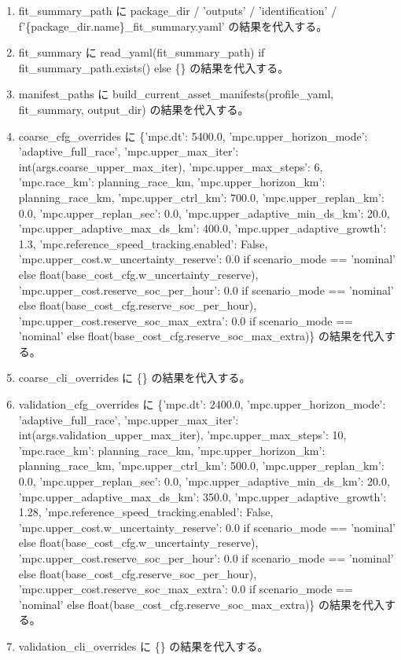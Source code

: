 \documentclass[a4paper,11pt]{article}
\begin{document}
\begin{enumerate}[leftmargin=1.8em]
\item fit\_summary\_path に package\_dir / 'outputs' / 'identification' / f'\{package\_dir.name\}\_fit\_summary.yaml' の結果を代入する。
\item fit\_summary に read\_yaml(fit\_summary\_path) if fit\_summary\_path.exists() else \{\} の結果を代入する。
\item manifest\_paths に build\_current\_asset\_manifests(profile\_yaml, fit\_summary, output\_dir) の結果を代入する。
\item coarse\_cfg\_overrides に \{'mpc.dt': 5400.0, 'mpc.upper\_horizon\_mode': 'adaptive\_full\_race', 'mpc.upper\_max\_iter': int(args.coarse\_upper\_max\_iter), 'mpc.upper\_max\_steps': 6, 'mpc.race\_km': planning\_race\_km, 'mpc.upper\_horizon\_km': planning\_race\_km, 'mpc.upper\_ctrl\_km': 700.0, 'mpc.upper\_replan\_km': 0.0, 'mpc.upper\_replan\_sec': 0.0, 'mpc.upper\_adaptive\_min\_ds\_km': 20.0, 'mpc.upper\_adaptive\_max\_ds\_km': 400.0, 'mpc.upper\_adaptive\_growth': 1.3, 'mpc.reference\_speed\_tracking.enabled': False, 'mpc.upper\_cost.w\_uncertainty\_reserve': 0.0 if scenario\_mode == 'nominal' else float(base\_cost\_cfg.w\_uncertainty\_reserve), 'mpc.upper\_cost.reserve\_soc\_per\_hour': 0.0 if scenario\_mode == 'nominal' else float(base\_cost\_cfg.reserve\_soc\_per\_hour), 'mpc.upper\_cost.reserve\_soc\_max\_extra': 0.0 if scenario\_mode == 'nominal' else float(base\_cost\_cfg.reserve\_soc\_max\_extra)\} の結果を代入する。
\item coarse\_cli\_overrides に \{\} の結果を代入する。
\item validation\_cfg\_overrides に \{'mpc.dt': 2400.0, 'mpc.upper\_horizon\_mode': 'adaptive\_full\_race', 'mpc.upper\_max\_iter': int(args.validation\_upper\_max\_iter), 'mpc.upper\_max\_steps': 10, 'mpc.race\_km': planning\_race\_km, 'mpc.upper\_horizon\_km': planning\_race\_km, 'mpc.upper\_ctrl\_km': 500.0, 'mpc.upper\_replan\_km': 0.0, 'mpc.upper\_replan\_sec': 0.0, 'mpc.upper\_adaptive\_min\_ds\_km': 20.0, 'mpc.upper\_adaptive\_max\_ds\_km': 350.0, 'mpc.upper\_adaptive\_growth': 1.28, 'mpc.reference\_speed\_tracking.enabled': False, 'mpc.upper\_cost.w\_uncertainty\_reserve': 0.0 if scenario\_mode == 'nominal' else float(base\_cost\_cfg.w\_uncertainty\_reserve), 'mpc.upper\_cost.reserve\_soc\_per\_hour': 0.0 if scenario\_mode == 'nominal' else float(base\_cost\_cfg.reserve\_soc\_per\_hour), 'mpc.upper\_cost.reserve\_soc\_max\_extra': 0.0 if scenario\_mode == 'nominal' else float(base\_cost\_cfg.reserve\_soc\_max\_extra)\} の結果を代入する。
\item validation\_cli\_overrides に \{\} の結果を代入する。

\end{enumerate}
\end{document}
